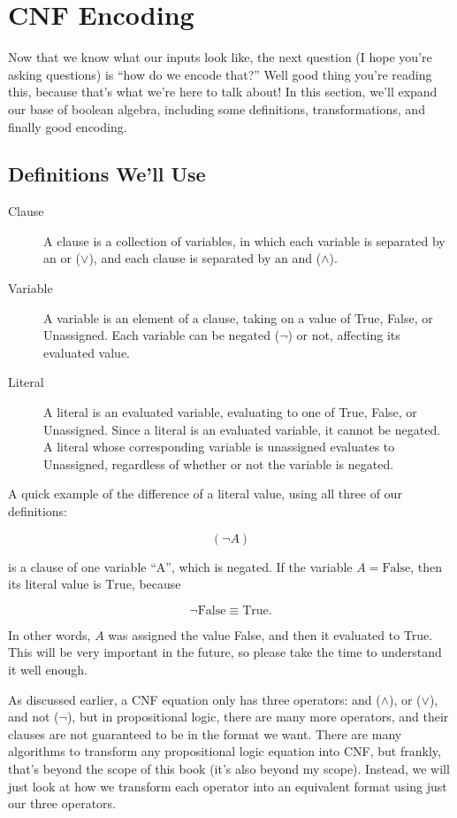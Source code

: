 \section{CNF Encoding}

Now that we know what our inputs look like, the next question (I hope you're
asking questions) is ``how do we encode that?'' Well good thing you're reading
this, because that's what we're here to talk about! In this section, we'll expand
our base of boolean algebra, including some definitions, transformations, and
finally good encoding.

\subsection*{Definitions We'll Use}

\begin{description}
    \item[Clause] A clause is a collection of variables, in which each variable is
    separated by an or ($\lor$), and each clause is separated by an and
    ($\land$).

    \item[Variable] A variable is an element of a clause, taking on a value of
    True, False, or Unassigned. Each variable can be negated ($\neg$) or not,
    affecting its evaluated value.

    \item[Literal] A literal is an evaluated variable, evaluating to one of True,
    False, or Unassigned. Since a literal is an evaluated variable, it cannot be
    negated. A literal whose corresponding variable is unassigned evaluates to
    Unassigned, regardless of whether or not the variable is negated.
\end{description}

A quick example of the difference of a literal value, using all three of our
definitions:

\[
(\neg A)
\]

is a clause of one variable ``A'', which is negated. If the variable
$A=\text{False}$, then its literal value is $\text{True}$, because

\[
\neg \text{False} \equiv \text{True}.
\]

In other words, $A$ was assigned the value False, and then it evaluated to
True. This will be very important in the future, so please take the time to
understand it well enough.

As discussed earlier, a CNF equation only has three operators: and ($\land$),
or ($\lor$), and not ($\neg$), but in propositional logic, there are many more
operators, and their clauses are not guaranteed to be in the format we want.
There are many algorithms to transform any propositional logic equation into
CNF, but frankly, that's beyond the scope of this book (it's also beyond my
scope). Instead, we will just look at how we transform each operator into an
equivalent format using just our three operators.

